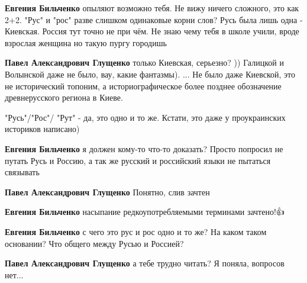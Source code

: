 \begin{itemize}
\begin{itemize}
\textbf{Евгения Бильченко} опыляют возможно тебя. Не вижу ничего сложного, это как 2+2. "Рус" и "рос" разве слишком одинаковые корни слов?
Русь была лишь одна - Киевская. Россия тут точно не при чём. Не знаю чему тебя в школе учили, вроде взрослая женщина но такую пургу городишь🤣


\textbf{Павел Александрович Глущенко} только Киевская, серьезно? )) Галицкой и Волынской даже не было, вау, какие фантазмы). ... Не было даже Киевской, это не исторический топоним, а историографическое более позднее обозначение древнерусского региона в Киеве.


"Русь"/"Рос"/ "Рут" - да, это одно и то же. Кстати, это даже у проукраинских историков написано)


\textbf{Евгения Бильченко} я должен кому-то что-то доказать? Просто попросил не путать Русь и Россию, а так же русский и российский языки не пытаться связывать


\textbf{Павел Александрович Глущенко} Понятно, слив зачтен


\textbf{Евгения Бильченко} насыпание редкоупотребляемыми терминами зачтено!👍


\textbf{Евгения Бильченко} с чего это рус и рос одно и то же? На каком таком основании? Что общего между Русью и Россией?


\textbf{Павел Александрович Глущенко} а тебе трудно читать? Я поняла, вопросов нет...



\end{itemize}
\end{itemize}
